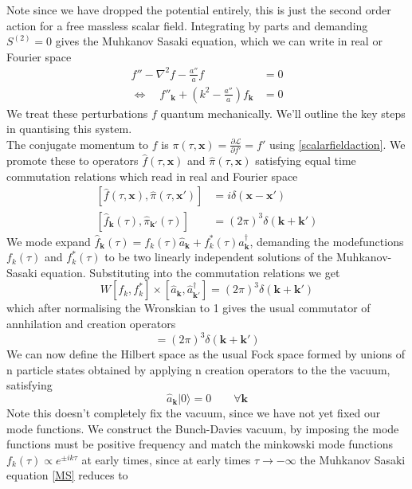 \documentclass[a4paper,10pt]{article}
\renewcommand{\v}[1]{\mathbf{#1}}
\newcommand{\ann}[1]{\hat{a}_{\v{#1}}}
\newcommand{\cre}[1]{\hat{a}^\dagger_{\v{#1}}}
\newcommand{\vac}{|0 \rangle}
\begin{document}
Note since we have dropped the potential entirely, this is just the second order action for a free massless scalar field. Integrating by parts and demanding $S^{(2)}=0$ gives the Muhkanov Sasaki equation, which we can write in real or Fourier space
\begin{equation}\begin{split}
f''-\nabla^2f-\frac{a''}{a}f &= 0 \\
\Leftrightarrow \quad f''_{\v{k}} + (k^2-\frac{a''}{a})f_{\v{k}} &= 0
\label{MS}
\end{split}\end{equation}
We treat these perturbations $f$ quantum mechanically. We'll outline the key steps in quantising this system.\\

The conjugate momentum to $f$ is $\pi(\tau, \v{x}) =  \frac{\partial \mathcal{L}}{\partial f'} = f'$ using \ref{scalarfieldaction}. We promote these to operators $\hat{f}(\tau, \v{x})$ and $\hat{\pi}(\tau, \v{x})$ satisfying equal time commutation relations which read in real and Fourier space
\begin{equation}\begin{split}
[\hat{f}(\tau, \v{x}), \hat{\pi}(\tau, \v{x'})] &= i\delta(\v{x}-\v{x'}) \\
[\hat{f}_{\v{k}}(\tau), \hat{\pi}_{\v{k'}}(\tau)] &= (2\pi)^3\delta(\v{k}+\v{k'})
\end{split}\end{equation}
We mode expand $\hat{f}_{\v{k}}(\tau) = f_k(\tau)\ann{k}+f_k^*(\tau)\cre{k}$, demanding the modefunctions $f_k(\tau)$ and $f_k^*(\tau)$ to be two linearly independent solutions of the Muhkanov-Sasaki equation. Substituting into the commutation relations we get 
\begin{equation}
W[f_k,f_k^*]\times[\ann{k}, \cre{k'}] = (2\pi)^3\delta(\v{k}+\v{k'})
\end{equation}
which after normalising the Wronskian to 1 gives the usual commutator of annhilation and creation operators
\begin{equation}
[\ann{k}, \cre{k'}] = (2\pi)^3\delta(\v{k}+\v{k'})
\end{equation}
We can now define the Hilbert space as the usual Fock space formed by unions of n particle states obtained by applying n creation operators to the the vacuum, satisfying 
\begin{equation}
\ann{k}\vac =0 \qquad \forall \v{k}
\end{equation}
Note this doesn't completely fix the vacuum, since we have not yet fixed our mode functions. We construct the Bunch-Davies vacuum, by imposing the mode functions must be positive frequency and match the minkowski mode functions $f_k(\tau) \propto e^{\pm ik\tau}$ at early times, since at early times $\tau \rightarrow -\infty$ the Muhkanov Sasaki equation \ref{MS} reduces to 
\end{document}
